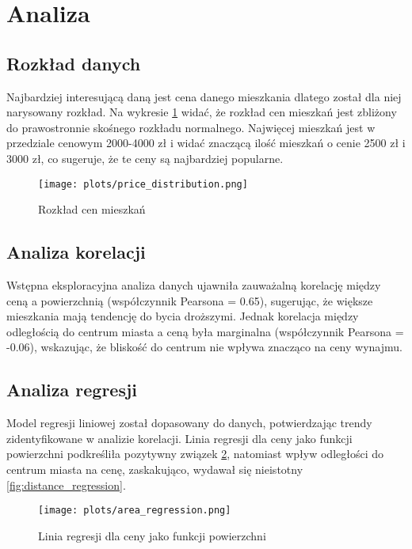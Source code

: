 \documentclass[12pt]{article}
\begin{document}
\section{Analiza}
\subsection{Rozkład danych}
Najbardziej interesującą daną jest cena danego mieszkania dlatego został dla niej narysowany rozkład. Na wykresie \ref{fig:price_distribution} widać, że rozkład cen mieszkań jest zbliżony do prawostronnie skośnego rozkładu normalnego. Najwięcej mieszkań jest w przedziale cenowym 2000-4000 zł i widać znaczącą ilość mieszkań o cenie 2500 zł i 3000 zł, co sugeruje, że te ceny są najbardziej popularne.

\begin{figure}[h]
  \centering
  \texttt{[image: plots/price\_distribution.png]}
  \caption{Rozkład cen mieszkań}
  \label{fig:price_distribution}
\end{figure}

\subsection{Analiza korelacji}
Wstępna eksploracyjna analiza danych ujawniła zauważalną korelację między ceną a powierzchnią (współczynnik Pearsona = 0.65), sugerując, że większe mieszkania mają tendencję do bycia droższymi. Jednak korelacja między odległością do centrum miasta a ceną była marginalna (współczynnik Pearsona = -0.06), wskazując, że bliskość do centrum  nie wpływa znacząco na ceny wynajmu.


\subsection{Analiza regresji}
Model regresji liniowej został dopasowany do danych, potwierdzając trendy zidentyfikowane w analizie korelacji. Linia regresji dla ceny jako funkcji powierzchni podkreśliła pozytywny związek \ref{fig:area_regression}, natomiast wpływ odległości do centrum miasta na cenę, zaskakująco, wydawał się nieistotny \ref{fig:distance_regression}.

\begin{figure}[h]
  \centering
  \texttt{[image: plots/area\_regression.png]}
  \caption{Linia regresji dla ceny jako funkcji powierzchni}
  \label{fig:area_regression}
\end{figure}
\end{document}
